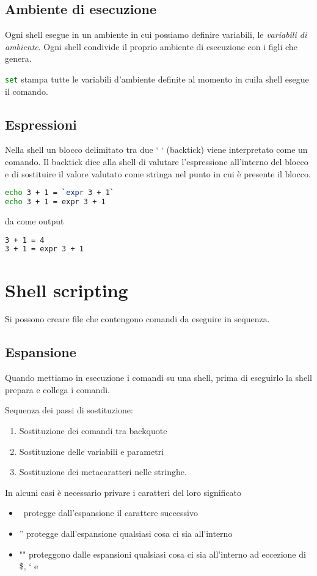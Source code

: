 \documentclass
[10pt,        %
 a4paper,     %
 onecolumn,   %
 fleqn,       %
 oneside,     %
 notitlepage, %
 openany      %
]{article}    %
\begin{document}
\subsection{Ambiente di esecuzione}
Ogni shell esegue in un ambiente in cui possiamo definire variabili, le \textit{variabili di ambiente}. Ogni shell condivide il proprio ambiente di esecuzione con i figli che genera.

\lstinline[language=bash]!set! stampa tutte le variabili d'ambiente definite al momento in cuila shell esegue il comando.

\subsection{Espressioni}
Nella shell un blocco delimitato tra due ` ` (backtick) viene interpretato come un comando. Il backtick dice alla shell di valutare l'espressione all'interno del blocco e di sostituire il valore valutato come stringa nel punto in cui è presente il blocco.

\begin{lstlisting}[language=bash]
echo 3 + 1 = `expr 3 + 1`
echo 3 + 1 = expr 3 + 1
\end{lstlisting}
da come output 
\begin{lstlisting}[language=bash]
3 + 1 = 4
3 + 1 = expr 3 + 1
\end{lstlisting}

\section{Shell scripting}
Si possono creare file che contengono comandi da eseguire in sequenza.
\subsection{Espansione}
Quando mettiamo in esecuzione i comandi su una shell, prima di eseguirlo la shell prepara e collega i comandi.

Sequenza dei passi di sostituzione:
\begin{enumerate}
    \item Sostituzione dei comandi tra backquote
    \item Sostituzione delle variabili e parametri
    \item Sostituzione dei metacaratteri nelle stringhe.
\end{enumerate}

In alcuni casi è necessario privare i caratteri del loro significato
\begin{itemize}
    \item \ protegge dall'espansione il carattere successivo
    \item '' protegge dall'espansione qualsiasi cosa ci sia all'interno
    \item "" proteggono dalle espansioni qualsiasi cosa ci sia all'interno ad eccezione di \$, ` e \
\end{itemize}
\end{document}
